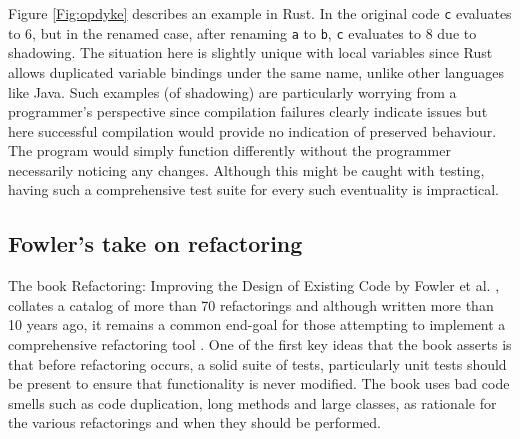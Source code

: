 \label{fig:listings}

Figure \ref{Fig:opdyke} describes an example in Rust. In the original code {\verb|c|} evaluates to 6, but in the renamed case, after renaming {\verb|a|} to {\verb|b|}, {\verb|c|} evaluates to 8 due to shadowing. The situation here is slightly unique with local variables since Rust allows duplicated variable bindings under the same name, unlike other languages like Java. Such examples (of shadowing) are particularly worrying from a programmer's perspective since compilation failures clearly indicate issues but here successful compilation would provide no indication of preserved behaviour. The program would simply function differently without the programmer necessarily noticing any changes. Although this might be caught with testing, having such a comprehensive test suite for every such eventuality is impractical.

\subsection{Fowler's take on refactoring}
The book Refactoring: Improving the Design of Existing Code by Fowler et al. \cite{fowler99}, collates a catalog of more than 70 refactorings and although written more than 10 years ago, it remains a common end-goal for those attempting to implement a comprehensive refactoring tool \cite{jetbrains15}. One of the first key ideas that the book asserts is that before refactoring occurs, a solid suite of tests, particularly unit tests should be present to ensure that functionality is never modified. The book uses bad code smells such as code duplication, long methods and large classes, as rationale for the various refactorings and when they should be performed. 

